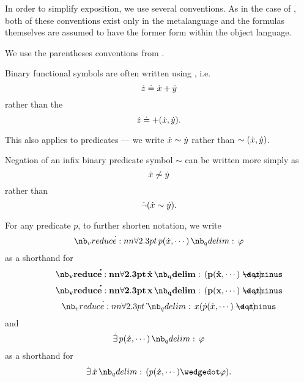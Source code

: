 \begin{remark}\label{rem:first_order_formula_conventions}
  In order to simplify exposition, we use several conventions. As in the case of , both of these conventions exist only in the metalanguage and the formulas themselves are assumed to have the former form within the object language.
  \begin{thmenum}
     We use the parentheses conventions from .

     Binary functional symbols are often written using , i.e.
    \begin{equation*}
      {\dot{z}} \doteq {\dot{x}} + {\dot{y}}
    \end{equation*}
    rather than the 
    \begin{equation*}
      {\dot{z}} \doteq +({\dot{x}}, {\dot{y}}).
    \end{equation*}

    This also applies to predicates --- we write \( {\dot{x}} \sim {\dot{y}} \) rather than \( \sim({\dot{x}}, {\dot{y}}) \).

     Negation of an infix binary predicate symbol \( \sim \) can be written more simply as
    \begin{equation*}
      {\dot{x}} \not\sim {\dot{y}}
    \end{equation*}
    rather than
    \begin{equation*}
      \dot\neg({\dot{x}} \sim {\dot{y}}).
    \end{equation*}

     For any predicate \( p \), to further shorten notation, we write
    \begin{equation*}
      \qforall {p(\synx, \cdots)} \varphi
    \end{equation*}
    as a shorthand for
    \begin{equation*}
      \mathbf{\qforall \synx (p(\synx, \cdots) \synimplies \varphi)}
    \end{equation*}
    \begin{equation*}
      \mathbf{\qforall x (p(x, \cdots) \synimplies \varphi)}
    \end{equation*}
    \begin{equation*}
      \qforall \dot x (\dot p(\dot x, \cdots) \synimplies \varphi)
    \end{equation*}
    and
    \begin{equation*}
      \qexists {p(\synx, \cdots)} \varphi
    \end{equation*}
    as a shorthand for
    \begin{equation*}
      \qexists \synx (p(\synx, \cdots) \synwedge \varphi).
    \end{equation*}


\end{thmenum}
\end{remark}
